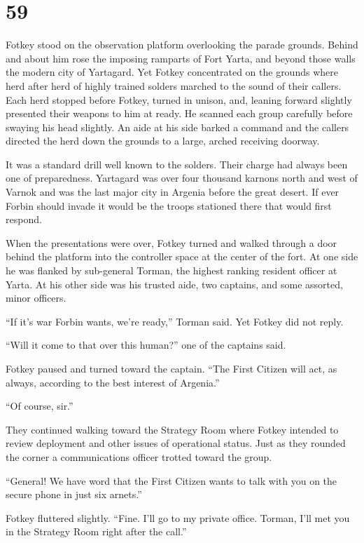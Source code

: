 
\chapter{59}

Fotkey stood on the observation platform overlooking the parade grounds. Behind and about him
rose the imposing ramparts of Fort Yarta, and beyond those walls the modern city of Yartagard.
Yet Fotkey concentrated on the grounds where herd after herd of highly trained solders marched
to the sound of their callers. Each herd stopped before Fotkey, turned in unison, and, leaning
forward slightly presented their weapons to him at ready. He scanned each group carefully before
swaying his head slightly. An aide at his side barked a command and the callers directed the
herd down the grounds to a large, arched receiving doorway.

It was a standard drill well known to the solders. Their charge had always been one of
preparedness. Yartagard was over four thousand karnons north and west of Varnok and was the last
major city in Argenia before the great desert. If ever Forbin should invade it would be the
troops stationed there that would first respond.

When the presentations were over, Fotkey turned and walked through a door behind the platform
into the controller space at the center of the fort. At one side he was flanked by sub-general
Torman, the highest ranking resident officer at Yarta. At his other side was his trusted aide,
two captains, and some assorted, minor officers.

``If it's war Forbin wants, we're ready,'' Torman said. Yet Fotkey did not reply.

``Will it come to that over this human?'' one of the captains said.

Fotkey paused and turned toward the captain. ``The First Citizen will act, as always, according
to the best interest of Argenia.''

``Of course, sir.''

They continued walking toward the Strategy Room where Fotkey intended to review deployment and
other issues of operational status. Just as they rounded the corner a communications officer
trotted toward the group.

``General! We have word that the First Citizen wants to talk with you on the secure phone in
just six arnets.''

Fotkey fluttered slightly. ``Fine. I'll go to my private office. Torman, I'll met you in the
Strategy Room right after the call.''

